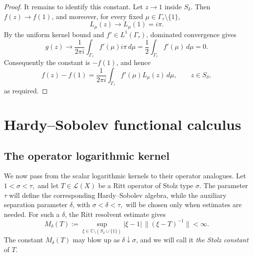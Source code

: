 \documentclass[11pt]{amsart}
\numberwithin{equation}{section}
\newtheorem{remark}[theorem]{Remark}
\theoremstyle{definition}
\theoremstyle{plain}
\def\L{L}
\renewcommand{\L}{\mathcal L}
\begin{document}
\begin{proof}
It remains to identify this constant. Let \(z\to1\) inside \(S_\delta\). Then
\(f(z)\to f(1)\), and moreover, for every fixed
\(\mu\in\Gamma_\tau\setminus\{1\}\),
\[
        L_\mu(z)\to L_\mu(1)=i\pi .
\]
By the uniform kernel bound and \(f'\in L^1(\Gamma_\tau)\), dominated
convergence gives
\[
        g(z)\to
        \frac{1}{2\pi i}
        \int_{\Gamma_\tau}f'(\mu)i\pi\,d\mu
        =
        \frac12\int_{\Gamma_\tau}f'(\mu)\,d\mu
        =
        0.
\]
Consequently the constant is \(-f(1)\), and hence
\[
        f(z)-f(1)
        =
        \frac{1}{2\pi i}
        \int_{\Gamma_\tau}f'(\mu)L_\mu(z)\,d\mu,
        \qquad z\in S_\delta,
\]
as required.
\end{proof}


\section{Hardy--Sobolev functional calculus}\label{hcalculus}

\subsection{The operator logarithmic kernel}

We now pass from the scalar logarithmic kernels to their operator analogues.  Let
\(
        1<\sigma<\tau,
\)
and let \(T\in\L(X)\) be a Ritt operator of Stolz type \(\sigma\).
The parameter \(\tau\) will define the corresponding Hardy--Sobolev algebra, while the auxiliary
separation parameter \(\delta\), with
\(
        \sigma<\delta<\tau,
\)
will be chosen only when estimates are needed.  For such a \(\delta\), the
Ritt resolvent estimate gives
\begin{equation}\label{eq:Ritt-delta-bound}
        M_{\delta}(T):=
\sup_{\xi\in\mathbb C\setminus(S_\delta\cup\{1\})}
|\xi-1|\,\|(\xi-T)^{-1}\|<\infty.
\end{equation}
The constant \(M_{\delta}(T)\) may blow up as \(\delta\downarrow\sigma\),
and we will call it \emph{the Stolz constant} of $T.$
\end{document}
